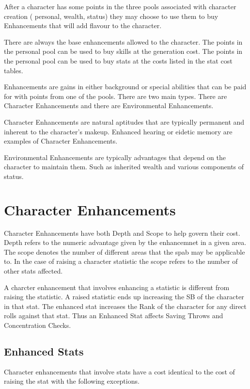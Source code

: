 After a character has some points in the three pools associated with
character creation ( personal, wealth, status) they may choose to
use them to buy Enhancements that will add flavour to the character.

There are always the base enhancements allowed to the character. The
points in the personal pool can be used to buy skills at the generation
cost. The points in the personal pool can be used to buy stats at the costs
listed in the stat cost tables.

Enhancements are gains in either background or special abilities that
can be paid for with points from one of the pools. There are two main
types. There are Character Enhancements and there are
Environmental Enhancements.

Character Enhancements are natural aptitudes that are typically 
permanent and inherent to the character's makeup. Enhanced hearing or
eidetic memory are examples of Character Enhancements.

Environmental Enhancements are typically advantages that depend on  the
character to maintain them. Such as inherited wealth and various components 
of status.



\section{Character Enhancements}

Character Enhancements have both Depth and Scope to help govern their cost.
Depth refers to the numeric advantage given by the enhancemnet in a given
area. The scope denotes the number of different areas that the spab
may be applicable to. In the case of raising a character statistic the 
scope refers to the number of other stats affected.

A charcter enhancement that involves enhancing a statistic is different from 
raising the statistic. A raised statistic ends up increasing the SB of the 
character in that stat. The enhanced stat increases the Rank of the 
character for any direct rolls against that stat. Thus an Enhanced Stat
affects Saving Throws and Concentration Checks.

\subsection{Enhanced Stats}
Character enhancements that involve stats have a cost identical to the 
cost of raising the stat with the following exceptions.

